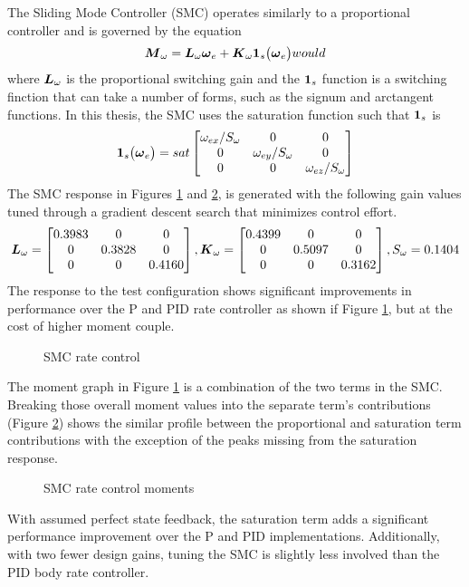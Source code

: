 The Sliding Mode Controller (SMC) operates similarly to a proportional controller and is governed by the equation
\begin{equation}
  \boldsymbol{M}_{\omega} = \boldsymbol{L}_{\omega} \boldsymbol{\omega}_e + \boldsymbol{K}_{\omega}\boldsymbol{1}_s \big(\boldsymbol{\omega}_e \big)
  \label{eqn:SMController}would
\end{equation}
where $\boldsymbol{L}_{\omega}$ is the proportional switching gain and the $\boldsymbol{1}_s$ function is a switching finction that can take a number of forms, such as the signum and arctangent functions.  In this thesis, the SMC uses the saturation function such that $\boldsymbol{1}_s$ is
\begin{equation}
  \boldsymbol{1}_s \big(\boldsymbol{\omega}_e \big) = sat \begin{bmatrix} \omega_{ex} / S_{\omega} &0 &0 \\ 0 & \omega_{ey} / S_{\omega} & 0 \\ 0 & 0 & \omega_{ez} / S_{\omega} \end{bmatrix}
\end{equation}
The SMC response in Figures \ref{fig:SMCRateControl} and \ref{fig:SMCRateControlMoments}, is generated with the following gain values tuned through a gradient descent search that minimizes control effort.
\begin{equation}
    \boldsymbol{L}_{\omega} = \begin{bmatrix} 0.3983 & 0 & 0 \\ 0 & 0.3828 & 0 \\ 0 & 0 & 0.4160 \end{bmatrix},
    \boldsymbol{K}_{\omega} = \begin{bmatrix} 0.4399 & 0 & 0 \\ 0 & 0.5097 & 0 \\ 0 & 0 & 0.3162 \end{bmatrix},
    S_{\omega} = 0.1404
  \label{SMCRateControlGains}
\end{equation}
The response to the test configuration shows significant improvements in performance over the P and PID rate controller as shown if Figure \ref{fig:SMCRateControl}, but at the cost of higher moment couple.
\begin{figure}[H]
  \centerline{}
  \caption{SMC rate control}
  \label{fig:SMCRateControl}
\end{figure}
The moment graph in Figure \ref{fig:SMCRateControl} is a combination of the two terms in the SMC.  Breaking those overall moment values into the separate term's contributions (Figure \ref{fig:SMCRateControlMoments}) shows the similar profile between the proportional and saturation term contributions with the exception of the peaks missing from the saturation response.
\begin{figure}[H]
  \centerline{}
  \caption{SMC rate control moments}
  \label{fig:SMCRateControlMoments}
\end{figure}
With assumed perfect state feedback, the saturation term adds a significant performance improvement over the P and PID implementations.  Additionally, with two fewer design gains, tuning the SMC is slightly less involved than the PID body rate controller.

